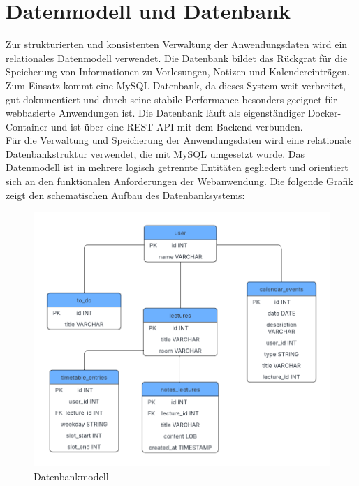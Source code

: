 \section{Datenmodell und Datenbank}
Zur strukturierten und konsistenten Verwaltung der Anwendungsdaten wird ein relationales Datenmodell verwendet. Die Datenbank bildet das Rückgrat für die Speicherung von Informationen zu Vorlesungen, Notizen und Kalendereinträgen.\\
Zum Einsatz kommt eine MySQL-Datenbank, da dieses System weit verbreitet, gut dokumentiert und durch seine stabile Performance besonders geeignet für webbasierte Anwendungen ist. Die Datenbank läuft als eigenständiger Docker-Container und ist über eine REST-API mit dem Backend verbunden.\\
Für die Verwaltung und Speicherung der Anwendungsdaten wird eine relationale Datenbankstruktur verwendet, die mit MySQL umgesetzt wurde. Das Datenmodell ist in mehrere logisch getrennte Entitäten gegliedert und orientiert sich an den funktionalen Anforderungen der Webanwendung. Die folgende Grafik zeigt den schematischen Aufbau des Datenbanksystems:
\begin{figure}[H]
  \centering
  \includegraphics[width=1\textwidth]{./images/datenbankmodell.png}
  \caption{Datenbankmodell}
  \label{fig:datenbankmodell}
\end{figure}

